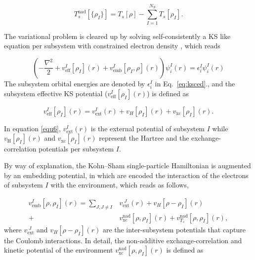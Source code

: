 \documentclass[notitlepage,12pt]{report}
\begin{document}
	\begin{equation}
		\label{nad}
		T_{s}^{\mathrm{nad}}[\{\rho_{I}\}] = T_{s}[\rho] - \sum\limits_{I=1}^{N_S} T_{s}[\rho_{I}].
	\end{equation}

	The variational problem is cleared up by solving self-consistently a KS like equation per subsystem with constrained electron density \supercite{wesolowski1994ab}, which reads

	\begin{equation}\label{eq:ksced}
		\left( -\frac{\nabla^2}{2} + v_{\mathrm{eff}}^{I}[\rho_I](r) + v_{\mathrm{emb}}^{I}[\rho_{I},\rho](r) \right) \psi_{i}^I(r) = \epsilon_{i}^I \psi_{i}^I(r)
	\end{equation}
	The subsystem orbital energies are denoted by $\epsilon_{i}^I$ in Eq.\ \ref{eq:ksced}.\supercite{sDFT}, and the subsystem effective KS potential ($v_{\mathrm{eff}}^{I}[\rho_I](r)$) is defined as

	\begin{equation}\label{equ6}
		v_{\mathrm{eff}}^{I}[\rho_I](r) = v_{\mathrm{ext}}^I(r) + v_{{H}}[\rho_I](r) + v_{\mathrm{xc}}[\rho_I](r).
	\end{equation}

	In equation \ref{equ6},  $v_{\mathrm{ext}}^I(r)$ is the  external potential of subsystem $I$ while $v_{\mathrm{H}}[\rho_I](r)$ and $v_{\mathrm{xc}}[\rho_I](r)$ represent the Hartree and the exchange-correlation potentials per subsystem $I$.

	By way of explanation, the Kohn–Sham single-particle Hamiltonian is augmented by an embedding potential, in which  are encoded the interaction of the electrons of subsystem $I$ with the environment, which reads as follows,

	\begin{equation}\label{embedd}
		\begin{aligned}
			v_{\mathrm{emb}}^{I}[\rho,\rho_I](r) = \sum\limits_{J,J \neq I} &v_{\mathrm{ext}}^{\; J}(r) + v_{{H}}[\rho - \rho_I](r)  \\ + \ &v_{\mathrm{xc}}^{\mathrm{nad}}[\rho,\rho_{I}](r) + v_{T_s}^{\mathrm{nad}}[\rho,\rho_{I}](r),
		\end{aligned}
	\end{equation}
	where $v_{\mathrm{ext}}^{\; J}$ and $v_{{H}}[\rho - \rho_I](r)$ are the inter-subsystem potentials that capture the Coulomb interactions. In detail, the non-additive exchange-correlation and kinetic potential of the environment $v_{\mathrm{xc}}^{\mathrm{nad}}[\rho,\rho_{I}](r)$ is defined as
	
\end{document}
